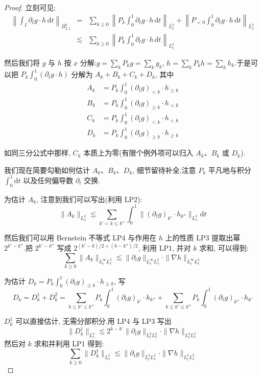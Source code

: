 \begin{proof}
立刻可见:
\[
\begin{array}{rcl}
\left\| \int_I \partial_t g \cdot h\, \mathrm{d}t \right\|_{B_{2, 1}^{0}} &=& \sum_{k \geq 0} \left\| P_k \int_0^1 \partial_t g \cdot h\, \mathrm{d}t \right\|_{L_x^2} + \left\| P_{<0} \int_0^1 \partial_t g \cdot h\, \mathrm{d}t \right\|_{L_x^2} \\
&\lesssim& \sum_{k \geq 0} \left\| P_k \int_0^1 \partial_t g \cdot h\, \mathrm{d}t \right\|_{L_x^2}
\end{array}
\]

然后我们将 $g$ 与 $h$ 按 $x$ 分解:$g = \sum_k P_k g = \sum_k g_k$, $h = \sum_k P_k h = \sum_k h_k$.于是可以把 $P_k \int_0^1 (\partial_t g \cdot h)$ 分解为 $A_k + B_k + C_k + D_k$, 其中
\begin{align*}
A_k &= P_k \int_0^1 (\partial_t g)_{<k} \cdot h_{\geq k} \\
B_k &= P_k \int_0^1 (\partial_t g)_{\geq k} \cdot h_{<k} \\
C_k &= P_k \int_0^1 (\partial_t g)_{<k} \cdot h_{<k} \\
D_k &= P_k \int_0^1 (\partial_t g)_{\geq k} \cdot h_{\geq k}
\end{align*}

如同三分公式中那样, $C_k$ 本质上为零(有限个例外项可以归入 $A_k$、$B_k$ 或 $D_k$).

我们现在简要勾勒如何估计 $A_k$、$B_k$、$D_k$, 细节留待补全.注意 $P_k$ 平凡地与积分 $\int_0^1 \mathrm{d}t$ 以及任何偏导数 $\partial_t$ 交换.

为估计 $A_k$, 注意到我们可以写出(利用 LP2):
\[
\|A_k\|_{L_x^2} \lesssim \sum_{k' < k \leq k''} \int_0^1 \|(\partial_t g)_{k'} \cdot h_{k''}\|_{L_x^2} \mathrm{d}t
\]

然后我们可以用 Bernstein 不等式 LP4 与作用在 $h$ 上的性质 LP3 提取出幂 $2^{k'-k''}$.把 $2^{k'-k''}$ 写成 $2^{(k'-k)/2 + (k-k'')/2}$, 利用 LP1, 并对 $k$ 求和, 可以得到:
\[
\sum_{k \geq 0} \|A_k\|_{L_t^\infty L_x^2} \lesssim \|\partial_t g\|_{L_t^\infty L_x^2} \cdot \|\nabla h\|_{L_t^\infty L_x^2}
\]

为估计 $D_k = P_k \int_0^1 (\partial_t g)_{\geq k} \cdot h_{\geq k}$, 写
\[
D_k = D_k^1 + D_k^2 = \sum_{k \leq k' \leq k''} P_k \int_0^1 (\partial_t g)_{k'} \cdot h_{k''} + \sum_{k \leq k' \leq k''} P_k \int_0^1 (\partial_t g)_{k''} \cdot h_{k'}
\]

$D_k^1$ 可以直接估计, 无需分部积分.用 LP4 与 LP3 写出
\[
\|D_k^1\|_{L_x^2} \lesssim 2^{k-k'} \|\partial_t g\|_{L_t^2 L_x^2} \cdot \|\nabla h\|_{L_t^2 L_x^2}
\]
然后对 $k$ 求和并利用 LP1 得到:
\[
\sum_{k \geq 0} \|D_k^1\|_{L_x^2} \lesssim \|\partial_t g\|_{L_t^2 L_x^2} \cdot \|\nabla h\|_{L_t^2 L_x^2}
\]


\end{proof}
